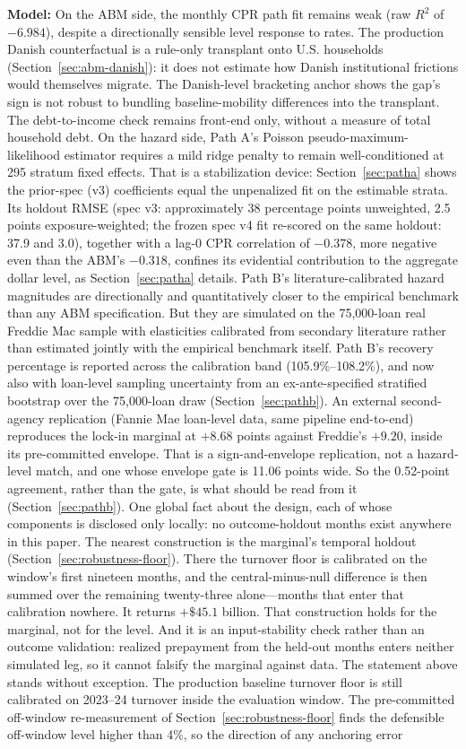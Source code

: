 \documentclass[12pt]{article}
\begin{document}
\textbf{Model:} On the ABM side, the monthly CPR path fit remains weak (raw $R^2$ of $-6.984$), despite a directionally sensible level response to rates. The production Danish counterfactual is a rule-only transplant onto U.S. households (Section~\ref{sec:abm-danish}): it does not estimate how Danish institutional frictions would themselves migrate. The Danish-level bracketing anchor shows the gap's sign is not robust to bundling baseline-mobility differences into the transplant. The debt-to-income check remains front-end only, without a measure of total household debt. On the hazard side, Path A's Poisson pseudo-maximum-likelihood estimator requires a mild ridge penalty to remain well-conditioned at 295 stratum fixed effects. That is a stabilization device: Section~\ref{sec:patha} shows the prior-spec (v3) coefficients equal the unpenalized fit on the estimable strata. Its holdout RMSE (spec v3: approximately 38 percentage points unweighted, 2.5 points exposure-weighted; the frozen spec v4 fit re-scored on the same holdout: 37.9 and 3.0), together with a lag-0 CPR correlation of $-0.378$, more negative even than the ABM's $-0.318$, confines its evidential contribution to the aggregate dollar level, as Section~\ref{sec:patha} details. Path B's literature-calibrated hazard magnitudes are directionally and quantitatively closer to the empirical benchmark than any ABM specification. But they are simulated on the 75,000-loan real Freddie Mac sample with elasticities calibrated from secondary literature rather than estimated jointly with the empirical benchmark itself. Path B's recovery percentage is reported across the calibration band (105.9\%--108.2\%), and now also with loan-level sampling uncertainty from an ex-ante-specified stratified bootstrap over the 75,000-loan draw (Section~\ref{sec:pathb}). An external second-agency replication (Fannie Mae loan-level data, same pipeline end-to-end) reproduces the lock-in marginal at $+8.68$ points against Freddie's $+9.20$, inside its pre-committed envelope. That is a sign-and-envelope replication, not a hazard-level match, and one whose envelope gate is 11.06 points wide. So the 0.52-point agreement, rather than the gate, is what should be read from it (Section~\ref{sec:pathb}). One global fact about the design, each of whose components is disclosed only locally: no outcome-holdout months exist anywhere in this paper. The nearest construction is the marginal's temporal holdout (Section~\ref{sec:robustness-floor}). There the turnover floor is calibrated on the window's first nineteen months, and the central-minus-null difference is then summed over the remaining twenty-three alone---months that enter that calibration nowhere. It returns $+\$45.1$ billion. That construction holds for the marginal, not for the level. And it is an input-stability check rather than an outcome validation: realized prepayment from the held-out months enters neither simulated leg, so it cannot falsify the marginal against data. The statement above stands without exception. The production baseline turnover floor is still calibrated on 2023--24 turnover inside the evaluation window. The pre-committed off-window re-measurement of Section~\ref{sec:robustness-floor} finds the defensible off-window level higher than 4\%, so the direction of any anchoring error 
\end{document}
